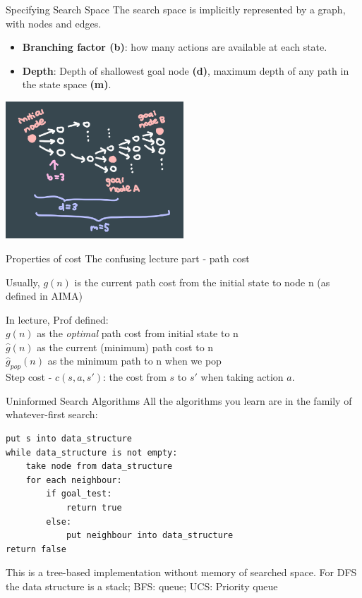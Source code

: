 \documentclass[10pt]{beamer}
\begin{document}
\begin{frame}[fragile]{Specifying Search Space}
The search space is implicitly represented by a graph, with nodes and edges.
\begin{itemize}
  \item \textbf{Branching factor (b)}: how many actions are available at each state.
  \item \textbf{Depth}: Depth of shallowest goal node \textbf{(d)}, maximum depth of any path in the state space \textbf{(m)}.
\end{itemize}
\begin{center}
\includegraphics[width = 0.5\textwidth]{img/m_d.png}
\end{center}
\end{frame}

\begin{frame}[fragile]{Properties of cost}
The confusing lecture part - path cost

Usually, $g(n)$ is the current path cost from the initial state to node n (as defined in AIMA)

In lecture, Prof defined: \\
$g(n)$ as the \textit{optimal} path cost from initial state to n\\
$\hat{g}(n)$ as the current (minimum) path cost to n \\
$\hat{g}_{pop}(n)$ as the minimum path to n when we pop\\

Step cost - $c(s, a, s')$: the cost from $s$ to $s'$ when taking action $a$.
\end{frame}

\begin{frame}[fragile]{Uninformed Search Algorithms}
All the algorithms you learn are in the family of whatever-first search:

\begin{verbatim}
put s into data_structure
while data_structure is not empty:
    take node from data_structure
    for each neighbour:
        if goal_test:
            return true
        else:
            put neighbour into data_structure
return false
\end{verbatim}

This is a tree-based implementation without memory of searched space.
For DFS the data structure is a stack; BFS: queue; UCS: Priority queue

\end{frame}
\end{document}
